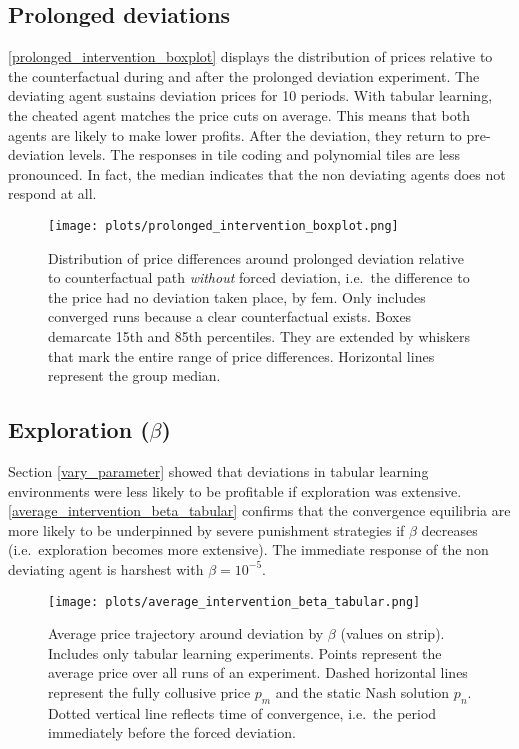 \subsection{Prolonged deviations}\label{prolonged_deviations_appendix}

\autoref{prolonged_intervention_boxplot} displays the distribution of prices relative to the counterfactual during and after the prolonged deviation experiment. The deviating agent sustains deviation prices for 10 periods. With tabular learning, the cheated agent matches the price cuts on average. This means that both agents are likely to make lower profits. After the deviation, they return to pre-deviation levels. The responses in tile coding and polynomial tiles are less pronounced. In fact, the median indicates that the non deviating agents does not respond at all. 

\begin{figure}
		\texttt{[image: plots/prolonged\_intervention\_boxplot.png]}
		\caption[Distribution of price differences around prolonged deviation by \gls{fem}]{Distribution of price differences around prolonged deviation relative to counterfactual path \emph{without} forced deviation, i.e.\ the difference to the price had no deviation taken place, by \gls{fem}. Only includes converged runs because a clear counterfactual exists. Boxes demarcate 15th and 85th percentiles. They are extended by whiskers that mark the entire range of price differences. Horizontal lines represent the group median.}
		\label{prolonged_intervention_boxplot}
\end{figure}


\clearpage

\subsection{Exploration ($\beta$)}\label{beta_appendix}

Section \ref{vary_parameter} showed that deviations in tabular learning environments were less likely to be profitable if exploration was extensive. \autoref{average_intervention_beta_tabular} confirms that the convergence equilibria are more likely to be underpinned by severe punishment strategies if $\beta$ decreases (i.e.\ exploration becomes more extensive). The immediate response of the non deviating agent is harshest with $\beta = 10^{-5}$.

\begin{figure}
	\texttt{[image: plots/average\_intervention\_beta\_tabular.png]}
	\caption[Average price trajectory around deviation by $\beta$]{Average price trajectory around deviation by $\beta$ (values on strip). Includes only tabular learning experiments. Points represent the average price over all runs of an experiment. Dashed horizontal lines represent the fully collusive price $p_m$ and the static Nash solution $p_n$. Dotted vertical line reflects time of convergence, i.e.\ the period immediately before the forced deviation.}
	\label{average_intervention_beta_tabular}
\end{figure}


